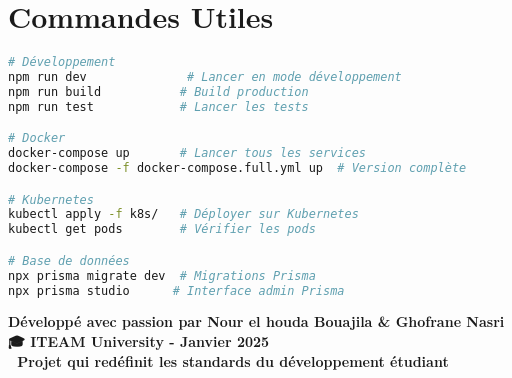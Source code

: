 \documentclass[12pt,a4paper]{report}
\begin{document}
\chapter{Commandes Utiles}

\begin{lstlisting}[language=bash, caption=Commandes de développement]
# Développement
npm run dev              # Lancer en mode développement
npm run build           # Build production
npm run test            # Lancer les tests

# Docker
docker-compose up       # Lancer tous les services
docker-compose -f docker-compose.full.yml up  # Version complète

# Kubernetes
kubectl apply -f k8s/   # Déployer sur Kubernetes
kubectl get pods        # Vérifier les pods

# Base de données
npx prisma migrate dev  # Migrations Prisma
npx prisma studio      # Interface admin Prisma
\end{lstlisting}

\vfill

\begin{center}
\textbf{Développé avec passion par Nour el houda Bouajila \& Ghofrane Nasri}\\
\textbf{🎓 ITEAM University - Janvier 2025}\\
\textbf{🚀 Projet qui redéfinit les standards du développement étudiant}
\end{center}
\end{document}
